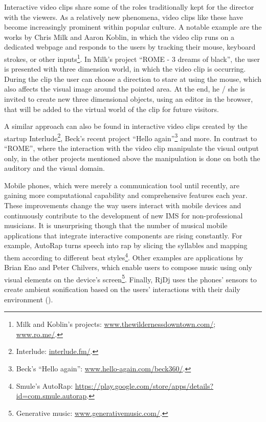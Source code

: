 \documentclass[a4paper,11pt]{article}
\begin{document}
Interactive video clips share some of the roles traditionally kept for the director with the viewers.
As a relatively new phenomena, video clips like these have become increasingly prominent within popular culture.
A notable example are the works by Chris Milk and Aaron Koblin, in which the video clip runs on a dedicated webpage and responds to the users by tracking their mouse, keyboard strokes, or other inputs\footnote{Milk and Koblin's projects: \href{http://www.thewildernessdowntown.com/}{www.thewildernessdowntown.com/}; \href{http://www.ro.me/}{www.ro.me/}.}.
In Milk's project ``ROME - 3 dreams of black'', the user is presented with three dimension world, in which the video clip is occurring.
During the clip the user can choose a direction to stare at using the mouse, which also affects the visual image around the pointed area.
At the end, he / she is invited to create new three dimensional objects, using an editor in the browser, that will be added to the virtual world of the clip for future visitors.

A similar approach can also be found in interactive video clips created by the startup Interlude\footnote{Interlude: \href{http://interlude.fm/}{interlude.fm/}.}, Beck's recent project ``Hello again''\footnote{Beck's ``Hello again'': \href{http://www.hello-again.com/beck360/}{www.hello-again.com/beck360/}.} and more.
In contrast to ``ROME'', where the interaction with the video clip manipulate the visual output only, in the other projects mentioned above the manipulation is done on both the auditory and the visual domain.

Mobile phones, which were merely a communication tool until recently, are gaining more computational capability and comprehensive features each year.
These improvements change the way users interact with mobile devices and continuously contribute to the development of new IMS for non-professional musicians.
It is unsurprising though that the number of musical mobile applications that integrate interactive components are rising constantly.
For example, AutoRap turns speech into rap by slicing the syllables and mapping them according to different beat styles\footnote{Smule's AutoRap: \href{https://play.google.com/store/apps/details?id=com.smule.autorap}{https://play.google.com/store/apps/details?id=com.smule.autorap}.}.
Other examples are applications by Brian Eno and Peter Chilvers, which enable users to compose music using only visual elements on the device's screen\footnote{Generative music: \href{http://www.generativemusic.com/}{www.generativemusic.com/}.}.
Finally, RjDj uses the phones' sensors to create ambient sonification based on the users' interactions with their daily environment (\cite{web:rjdj})\label{rjdj}.
\end{document}
